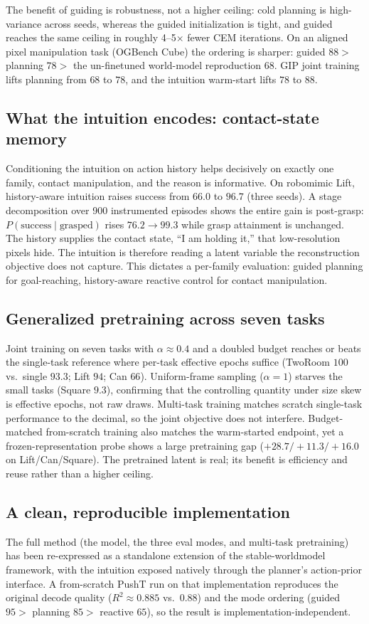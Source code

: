 \documentclass[11pt]{article}
\begin{document}
The benefit of guiding is robustness, not a higher ceiling: cold planning is high-variance across
seeds, whereas the guided initialization is tight, and guided reaches the same ceiling in roughly
4--5$\times$ fewer CEM iterations. On an aligned pixel manipulation task (OGBench Cube) the ordering
is sharper: guided $88 >$ planning $78 >$ the un-finetuned world-model reproduction $68$. GIP joint
training lifts planning from $68$ to $78$, and the intuition warm-start lifts $78$ to $88$.

\subsection{What the intuition encodes: contact-state memory}
Conditioning the intuition on action history helps decisively on exactly one family, contact
manipulation, and the reason is informative. On robomimic Lift, history-aware intuition raises
success from $66.0$ to $96.7$ (three seeds). A stage decomposition over 900 instrumented episodes
shows the entire gain is post-grasp: $P(\text{success}\mid\text{grasped})$ rises $76.2 \to 99.3$
while grasp attainment is unchanged. The history supplies the contact state, ``I am holding it,''
that low-resolution pixels hide. The intuition is therefore reading a latent variable the
reconstruction objective does not capture. This dictates a per-family evaluation: guided planning
for goal-reaching, history-aware reactive control for contact manipulation.

\subsection{Generalized pretraining across seven tasks}
Joint training on seven tasks with $\alpha\!\approx\!0.4$ and a doubled budget reaches or beats the
single-task reference where per-task effective epochs suffice (TwoRoom $100$ vs.\ single $93.3$;
Lift $94$; Can $66$). Uniform-frame sampling ($\alpha\!=\!1$) starves the small tasks (Square $9.3$),
confirming that the controlling quantity under size skew is effective epochs, not raw draws.
Multi-task training matches scratch single-task performance to the decimal, so the joint objective
does not interfere. Budget-matched from-scratch training also matches the warm-started endpoint, yet
a frozen-representation probe shows a large pretraining gap ($+28.7/+11.3/+16.0$ on Lift/Can/Square).
The pretrained latent is real; its benefit is efficiency and reuse rather than a higher ceiling.

\subsection{A clean, reproducible implementation}
The full method (the model, the three eval modes, and multi-task pretraining) has been re-expressed
as a standalone extension of the stable-worldmodel framework, with the intuition exposed natively
through the planner's action-prior interface. A from-scratch PushT run on that implementation
reproduces the original decode quality ($R^2\!\approx\!0.885$ vs.\ $0.88$) and the mode ordering
(guided $95 >$ planning $85 >$ reactive $65$), so the result is implementation-independent.
\end{document}
